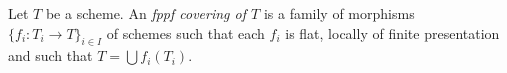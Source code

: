 \begin{definition}
\label{definition-fppf-covering}
Let $T$ be a scheme. An {\it fppf covering of $T$} is a family
of morphisms $\{f_i : T_i \to T\}_{i \in I}$ of schemes
such that each $f_i$ is flat, locally of finite presentation and such
that $T = \bigcup f_i(T_i)$.
\end{definition}